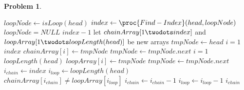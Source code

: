 \documentclass[12pt,a4paper]{report}
\newcommand{\get}{\leftarrow}
\theoremstyle{definition}
\newtheorem{problem}{\textbf{Problem}}
\theoremstyle{definition}
\begin{document}
\begin{problem}
\begin{enumerate}[label=\arabic*.]
\begin{enumerate}[label=\alph*.]
\begin{codebox}
\li $loopNode\get isLoop(head)$
\li $index\get \proc{Find-Index}(head, loopNode)$
\li \If $loopNode=NULL$ \Then
\li     \Return $index-1$
    \End
\li let $chainArray[1\twodots index]$ and $loopArray[1\twodots loopLength(head)]$ be new arrays
\li $tmpNode\get head$
\li \For $i=1$ \To $index$ \Do
\li     $chainArray[i]\get tmpNode$
\li     $tmpNode\get tmpNode.next$
    \End
\li \For $i=1$ \To $loopLength(head)$ \Do
\li     $loopArray[i]\get tmpNode$
\li     $tmpNode\get tmpNode.next$
    \End
\li $i_{chain}\get index$
\li $i_{loop}\get loopLength(head)$
\li \While $chainArray[i_{chain}]\neq loopArray[i_{loop}]$\Do
\li     $i_{chain}\get i_{chain}-1$
\li     $i_{loop}\get i_{loop}-1$
    \End
\li \Return $i_{chain}$

\end{codebox}
    \end{enumerate}

\end{enumerate}
\end{problem}

\newpage
\end{document}
